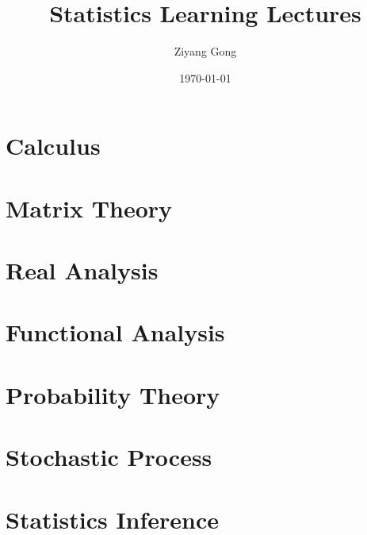 \documentclass{prettybook}
\title{Statistics Learning Lectures}
\author{Ziyang Gong}
\date{\today}
\begin{document}
\tableofcontents

\mainmatter

\part{Calculus}




\part{Matrix Theory}



\part{Real Analysis}



\part{Functional Analysis}

\part{Probability Theory}







\part{Stochastic Process}





\part{Statistics Inference}





\end{document}
